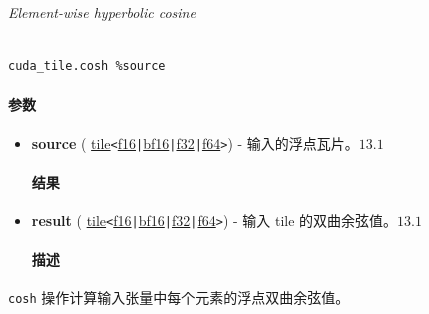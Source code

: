 \documentclass{article}
\begin{document}
\textit{Element-wise hyperbolic cosine}




\begin{lstlisting}

cuda_tile.cosh %source

\end{lstlisting}



\paragraph{参数}


\begin{itemize}
\item \textbf{source} ( \href{https://docs.nvidia.com/cuda/tile-ir/latest/sections/types.html#type-tile}{tile}\texttt{<}\href{https://docs.nvidia.com/cuda/tile-ir/latest/sections/types.html#subsection-element-types}{f16}\texttt{|}\href{https://docs.nvidia.com/cuda/tile-ir/latest/sections/types.html#subsection-element-types}{bf16}\texttt{|}\href{https://docs.nvidia.com/cuda/tile-ir/latest/sections/types.html#subsection-element-types}{f32}\texttt{|}\href{https://docs.nvidia.com/cuda/tile-ir/latest/sections/types.html#subsection-element-types}{f64}\texttt{>}) - 输入的浮点瓦片。$\boxed{13.1}$




\paragraph{结果}


\item \textbf{result} ( \href{https://docs.nvidia.com/cuda/tile-ir/latest/sections/types.html#type-tile}{tile}\texttt{<}\href{https://docs.nvidia.com/cuda/tile-ir/latest/sections/types.html#subsection-element-types}{f16}\texttt{|}\href{https://docs.nvidia.com/cuda/tile-ir/latest/sections/types.html#subsection-element-types}{bf16}\texttt{|}\href{https://docs.nvidia.com/cuda/tile-ir/latest/sections/types.html#subsection-element-types}{f32}\texttt{|}\href{https://docs.nvidia.com/cuda/tile-ir/latest/sections/types.html#subsection-element-types}{f64}\texttt{>}) - 输入 tile 的双曲余弦值。$\boxed{13.1}$




\paragraph{描述}


\end{itemize}
\texttt{cosh} 操作计算输入张量中每个元素的浮点双曲余弦值。
\end{document}
